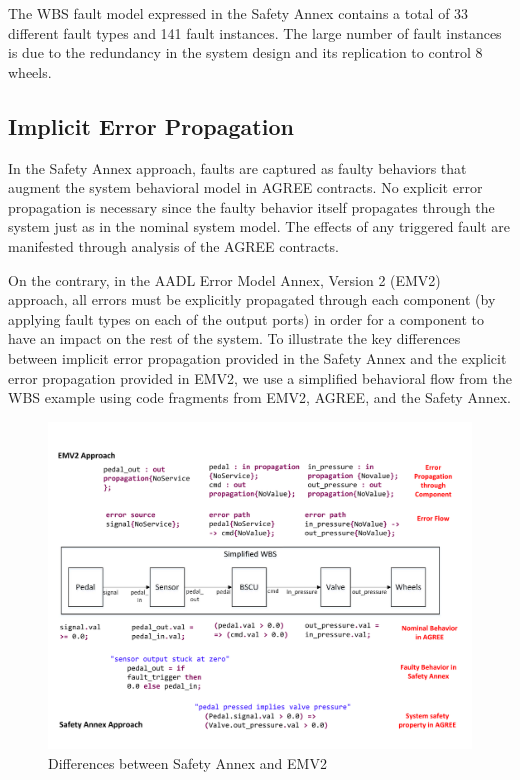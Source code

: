 The WBS fault model expressed in the Safety Annex contains a total of 33 different fault types and 141 fault instances. The large number of fault instances is due to the redundancy in the system design and its replication to control 8 wheels.

\subsection{Implicit %
	Error Propagation}
In the Safety Annex approach, faults are captured as faulty behaviors that augment the system behavioral model in AGREE contracts. No explicit %
error propagation is necessary since the faulty behavior itself propagates through the system just as in the nominal system model. The effects of any triggered fault are manifested through analysis of the AGREE contracts. 

On the contrary, in the AADL Error Model Annex, Version 2 (EMV2)~\cite{EMV2} approach, all errors must be explicitly propagated through each component (by applying fault types on each of the output ports) in order for a component to have an impact on the rest of the system. To illustrate the key differences between implicit %
error propagation provided in the Safety Annex and the explicit %
error propagation provided in EMV2, we use a simplified behavioral flow from the WBS example using code fragments from EMV2, AGREE, and the Safety Annex. 

\begin{figure}[t]
	\hspace*{-2cm}
	\vspace{-0.19in}
	\centering
	\includegraphics[trim=0 9 0 5,clip,width=\textwidth]{images/Comparison_with_EMV2.pdf}
	\caption{Differences between Safety Annex and EMV2}
	\label{fig:comparison_with_EMV2}
\end{figure} 

